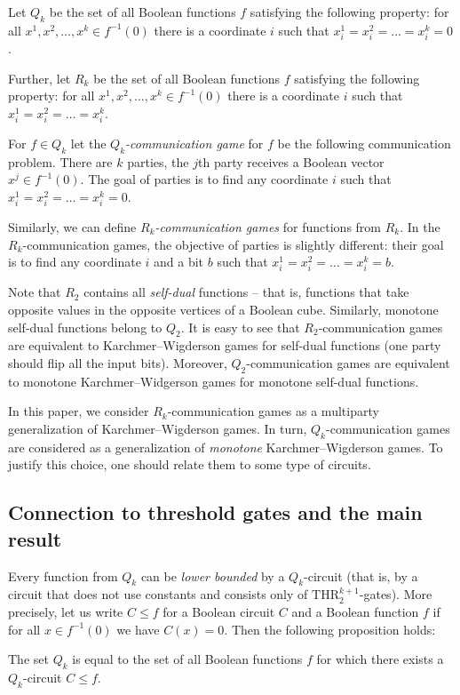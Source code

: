 \documentclass{toc}
\def\THR{\mathrm{THR}}
\begin{document}
\begin{definition}
Let $Q_k$ be the set of all Boolean functions $f$ satisfying the following property: for all $x^1, x^2, \ldots, x^k\in f^{-1}(0)$ there is a coordinate $i$ such that $x^1_i = x^2_i = \ldots =  x^k_i = 0$.

Further, let $R_k$ be the set of all Boolean functions $f$  satisfying the following property: for all $x^1, x^2, \ldots, x^k\in f^{-1}(0)$ there is a coordinate $i$ such that $x^1_i = x^2_i = \ldots =  x^k_i$.
\end{definition}



For $f\in Q_k$ let the \emph{$Q_k$-communication game} for $f$  be the following communication problem. There are $k$ parties, the $j$th party receives a Boolean vector $x^j\in f^{-1}(0)$. The goal of parties is to find any coordinate $i$ such that $x^1_i = x^2_i = \ldots = x^k_i = 0$.

Similarly, we can define \emph{$R_k$-communication games} for functions from $R_k$. In the $R_k$-commu\-ni\-ca\-tion %
%
games, the objective of parties is slightly different: their goal is to find any coordinate $i$  and a bit $b$ such that $x^1_i = x^2_i = \ldots = x^k_i = b$.

Note that $R_2$ contains all \emph{self-dual} functions -- that is, functions that take opposite values in the opposite vertices of a Boolean cube.
Similarly, monotone self-dual functions belong to $Q_2$. It is easy to see that $R_2$-communication games are equivalent to Karchmer--Wigderson games for self-dual functions (one party should flip all the input bits). Moreover, $Q_2$-communication games are equivalent to monotone Karchmer--Widgerson games for monotone self-dual functions. 

In this paper, we consider $R_k$-communication games as a multiparty generalization of Karchmer--Wigderson games. In turn, $Q_k$-communication games are considered as a generalization of \emph{monotone} Karchmer--Wigderson games. To justify this choice, one should relate them to some type of circuits. 

\subsection{Connection to threshold gates and the main result}

Every function from $Q_k$ can be \emph{lower bounded} by a $Q_k$-circuit (that is, by a circuit that does not use constants and consists only of $\THR^{k + 1}_2$-gates). More precisely, let us write $C \le f$ for a Boolean circuit $C$ and a Boolean function $f$ if for all $x\in f^{-1}(0)$ we have $C(x) = 0$. Then the following proposition holds:
\begin{proposition}
\label{Q_k_char}
The set $Q_k$ is equal to the set of all Boolean functions $f$ for which there exists a $Q_k$-circuit $C\le f$.
\end{proposition}
\end{document}
